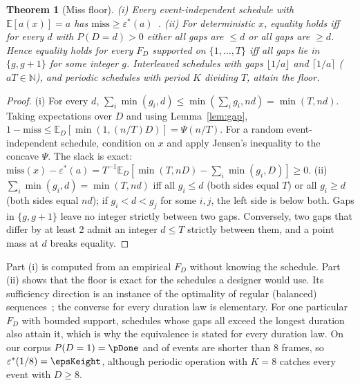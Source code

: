 \documentclass[lettersize,journal]{IEEEtran}
\newtheorem{theorem}{Theorem}
\theoremstyle{definition}
\theoremstyle{remark}
\newcommand{\eps}{\varepsilon}
\newcommand{\Psif}{\Psi}
\newcommand{\E}{\mathbb{E}}
\begin{document}
\begin{theorem}[Miss floor]\label{thm:floor}
(i) Every event-independent schedule with $\E[a(x)]=a$ has $\mathrm{miss}\ge\eps^*(a)$~\cite[Thms.~4--5]{deep3_jiot2026}.
(ii) For deterministic $x$, equality holds iff for every $d$ with $P(D=d)>0$ either all gaps are $\le d$ or all gaps are $\ge d$. Hence equality holds for every $F_D$ supported on $\{1,\dots,T\}$ iff all gaps lie in $\{g,g+1\}$ for some integer $g$. Interleaved schedules with gaps $\lfloor1/a\rfloor$ and $\lceil1/a\rceil$ ($aT\in\mathbb{N}$), and periodic schedules with period $K$ dividing $T$, attain the floor.
\end{theorem}
\begin{proof}
(i) For every $d$, $\sum_i\min(g_i,d)\le\min(\sum_ig_i,nd)=\min(T,nd)$. Taking expectations over $D$ and using Lemma~\ref{lem:gap}, $1-\mathrm{miss}\le\E_D[\min(1,(n/T)D)]=\Psif(n/T)$. For a random event-independent schedule, condition on $x$ and apply Jensen's inequality to the concave $\Psif$. The slack is exact: $\mathrm{miss}(x)-\eps^*(a)=T^{-1}\E_D[\min(T,nD)-\sum_i\min(g_i,D)]\ge0$.
(ii) $\sum_i\min(g_i,d)=\min(T,nd)$ iff all $g_i\le d$ (both sides equal $T$) or all $g_i\ge d$ (both sides equal $nd$); if $g_i<d<g_j$ for some $i,j$, the left side is below both. Gaps in $\{g,g+1\}$ leave no integer strictly between two gaps. Conversely, two gaps that differ by at least 2 admit an integer $d\le T$ strictly between them, and a point mass at $d$ breaks equality.
\end{proof}
\noindent Part (i) is computed from an empirical $F_D$ without knowing the schedule. Part (ii) shows that the floor is exact for the schedules a designer would use. Its sufficiency direction is an instance of the optimality of regular (balanced) sequences~\cite{hajek1985moor,altman2000moor}; the converse for every duration law is elementary. For one particular $F_D$ with bounded support, schedules whose gaps all exceed the longest duration also attain it, which is why the equivalence is stated for every duration law. On our corpus $P(D=1)=\pDone$ and \pDltEight{} of events are shorter than 8 frames, so $\eps^*(1/8)=\epsKeight$, although periodic operation with $K=8$ catches every event with $D\ge8$.
\end{document}
